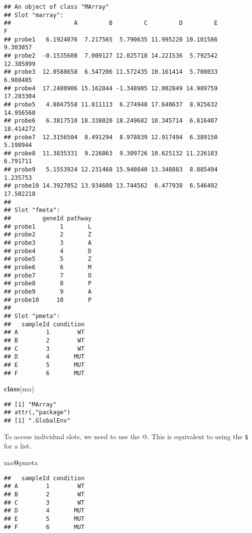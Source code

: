 \documentclass[]{article}
\newenvironment{Shaded}{\begin{snugshade}}{\end{snugshade}}
\newcommand{\KeywordTok}[1]{\textcolor[rgb]{0.13,0.29,0.53}{\textbf{#1}}}
\newcommand{\NormalTok}[1]{#1}
\newcommand{\OperatorTok}[1]{\textcolor[rgb]{0.81,0.36,0.00}{\textbf{#1}}}
\begin{document}
\begin{verbatim}
## An object of class "MArray"
## Slot "marray":
##                  A         B         C         D         E         F
## probe1   6.1924076  7.217565  5.790635 11.995220 10.101586  9.303057
## probe2  -0.1535608  7.009127 12.025718 14.221536  5.792542 12.385899
## probe3  12.0588658  6.547206 11.572435 10.161414  5.708033  6.988485
## probe4  17.2480906 15.162844 -1.348905 12.002849 14.989759 17.283304
## probe5   4.8047558 11.811113  6.274948 17.640637  8.925632 14.956560
## probe6   6.3817510 18.338020 18.249682 10.345714  6.816407 18.414272
## probe7  12.3156504  8.491294  8.978839 12.917494  6.389150  5.198944
## probe8  11.3835331  9.226863  9.309726 10.625132 11.226183  6.791711
## probe9   5.1553924 12.231468 15.940840 13.348883  8.885494  1.235753
## probe10 14.3927052 13.934608 13.744562  6.477938  6.546492 17.502218
## 
## Slot "fmeta":
##         geneId pathway
## probe1       1       L
## probe2       2       Z
## probe3       3       A
## probe4       4       D
## probe5       5       Z
## probe6       6       M
## probe7       7       O
## probe8       8       P
## probe9       9       A
## probe10     10       P
## 
## Slot "pmeta":
##   sampleId condition
## A        1        WT
## B        2        WT
## C        3        WT
## D        4       MUT
## E        5       MUT
## F        6       MUT
\end{verbatim}

\begin{Shaded}
\begin{Highlighting}[]
\KeywordTok{class}\NormalTok{(ma)}
\end{Highlighting}
\end{Shaded}

\begin{verbatim}
## [1] "MArray"
## attr(,"package")
## [1] ".GlobalEnv"
\end{verbatim}

To access individual slots, we need to use the @. This is equivalent to
using the \texttt{\$} for a list.

\begin{Shaded}
\begin{Highlighting}[]
\NormalTok{ma}\OperatorTok{@}\NormalTok{pmeta}
\end{Highlighting}
\end{Shaded}

\begin{verbatim}
##   sampleId condition
## A        1        WT
## B        2        WT
## C        3        WT
## D        4       MUT
## E        5       MUT
## F        6       MUT
\end{verbatim}
\end{document}
